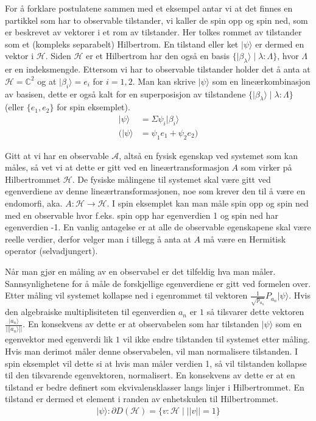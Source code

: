         For å forklare postulatene sammen med et eksempel antar vi at det finnes en partikkel som har to observable tilstander, vi kaller de spin opp og spin ned, som er beskrevet av vektorer i et rom av tilstander. Her tolkes rommet av tilstander som et (kompleks separabelt) Hilbertrom. En tilstand eller ket $|\psi\rangle$ er dermed en vektor i $\mathcal{H}$. Siden $\mathcal{H}$ er et Hilbertrom har den også en basis $\{|\beta_\lambda\rangle\mid\lambda : \Lambda\}$, hvor $\Lambda$ er en indeksmengde. Ettersom vi har to observable tilstander holder det å anta at $\mathcal{H}=\mathbb{C}^2$ og at $|\beta_i\rangle = e_i$ for $i=1,2$. Man kan skrive $|\psi\rangle$ som en lineærkombinasjon av basisen, dette er også kalt for en superposisjon av tilstandene $\{|\beta_\lambda\rangle\mid\lambda : \Lambda\}$ (eller $\{e_1, e_2\}$ for spin eksemplet).
        \begin{align*}
            |\psi\rangle & = \Sigma\psi_i|\beta_i\rangle \\
            (|\psi\rangle & = \psi_1e_1 + \psi_2e_2)
        \end{align*}

        Gitt at vi har en observable $\mathcal{A}$, altså en fysisk egenskap ved systemet som kan måles, så vet vi at dette er gitt ved en lineærtransformasjon $A$ som virker på Hilbertrommet $\mathcal{H}$. De fysiske målingene til systemet skal være gitt ved egenverdiene av denne lineærtransformasjonen, noe som krever den til å være en endomorfi, aka. $A:\mathcal{H}\rightarrow\mathcal{H}$. I spin eksemplet kan man måle spin opp og spin ned med en observable hvor f.eks. spin opp har egenverdien 1 og spin ned har egenverdien -1. En vanlig antagelse er at alle de observable egenskapene skal være reelle verdier, derfor velger man i tillegg å anta at $A$ må være en Hermitisk operator (selvadjungert).

        Når man gjør en måling av en observabel er det tilfeldig hva man måler. Sannsynlighetene for å måle de forskjellige egenverdiene er gitt ved formelen over. Etter måling vil systemet kollapse ned i egenrommet til vektoren $\frac{1}{\sqrt{p_{a_n}}}P_{a_n}|\psi\rangle$. Hvis den algebraiske multiplisiteten til egenverdien $a_n$ er $1$ så tilsvarer dette vektoren $\frac{|a_n\rangle}{|||a_n\rangle ||}$. En konsekvens av dette er at observabelen som har tilstanden $|\psi\rangle$ som en egenvektor med egenverdi lik $1$ vil ikke endre tilstanden til systemet etter måling. Hvis man derimot måler denne observabelen, vil man normalisere tilstanden. I spin eksemplet vil dette si at hvis man måler verdien 1, så vil tilstanden kollapse til den tilsvarende egenvektoren, normalisert. En konsekvens av dette er at en tilstand er bedre definert som ekvivalensklasser langs linjer i Hilbertrommet. En tilstand er dermed et element i randen av enhetskulen til Hilbertrommet.
        \begin{align*}
            |\psi\rangle : \partial D(\mathcal{H}) = \{v:\mathcal{H}\mid ||v||=1\}
        \end{align*}

